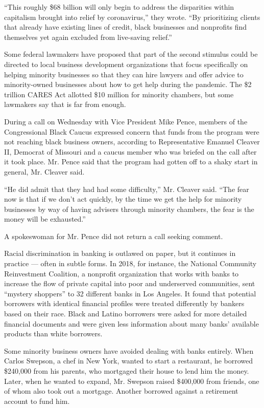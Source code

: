 ``This roughly \$68 billion will only begin to address the disparities
within capitalism brought into relief by coronavirus,'' they wrote. ``By
prioritizing clients that already have existing lines of credit, black
businesses and nonprofits find themselves yet again excluded from
live-saving relief.''

Some federal lawmakers have proposed that part of the second stimulus
could be directed to local business development organizations that focus
specifically on helping minority businesses so that they can hire
lawyers and offer advice to minority-owned businesses about how to get
help during the pandemic. The \$2 trillion CARES Act allotted \$10
million for minority chambers, but some lawmakers say that is far from
enough.

During a call on Wednesday with Vice President Mike Pence, members of
the Congressional Black Caucus expressed concern that funds from the
program were not reaching black business owners, according to
Representative Emanuel Cleaver II, Democrat of Missouri and a caucus
member who was briefed on the call after it took place. Mr. Pence said
that the program had gotten off to a shaky start in general, Mr. Cleaver
said.

``He did admit that they had had some difficulty,'' Mr. Cleaver said.
``The fear now is that if we don't act quickly, by the time we get the
help for minority businesses by way of having advisers through minority
chambers, the fear is the money will be exhausted.''

A spokeswoman for Mr. Pence did not return a call seeking comment.

Racial discrimination in banking is outlawed on paper, but it continues
in practice --- often in subtle forms. In 2018, for instance, the
National Community Reinvestment Coalition, a nonprofit organization that
works with banks to increase the flow of private capital into poor and
underserved communities, sent ``mystery shoppers'' to 32 different banks
in Los Angeles. It found that potential borrowers with identical
financial profiles were treated differently by bankers based on their
race. Black and Latino borrowers were asked for more detailed financial
documents and were given less information about many banks' available
products than white borrowers.

Some minority business owners have avoided dealing with banks entirely.
When Carlos Swepson, a chef in New York, wanted to start a restaurant,
he borrowed \$240,000 from his parents, who mortgaged their house to
lend him the money. Later, when he wanted to expand, Mr. Swepson raised
\$400,000 from friends, one of whom also took out a mortgage. Another
borrowed against a retirement account to fund him.


